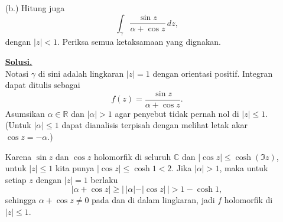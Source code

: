 \documentclass[12pt,twoside]{article}
\newenvironment{solution}
{
	\par\noindent\textbf{\underline{Solusi.}}\\
}
{
	\par
}
\begin{document}
\begin{enumerate}
\begin{enumerate}
\begin{solution}
                  Fungsi $\tan z$ memiliki kutub-kutub sederhana di titik-titik $z_k=\tfrac{\pi}{2}+k\pi$, $k\in\mathbb Z$, dengan residu $1$ di setiap kutub, karena di dekat $z_k$ berlaku
                  \[
                    \cos z\approx\cos'(z_k)(z-z_k)=-\sin(z_k)(z-z_k)=\mp (z-z_k),\quad \sin z_k=\pm1,
                  \]
                  sehingga $\tan z\sim\pm1/\bigl(\mp(z-z_k)\bigr)=1/(z-z_k)$.

                  Di dalam persegi panjang $R$ kita punya syarat $-\pi\le\Im z\le\pi$ dan $0\le\Re z\le2\pi N$. Maka $\Im z_k=0$ selalu memenuhi, sedangkan $\Re z_k=\frac\pi2+k\pi$ harus berada antara $0$ dan $2\pi N$. Hal ini setara dengan
                  \[
                    0\le\tfrac\pi2+k\pi\le2\pi N\iff -\tfrac12\le k\le2N-\tfrac12.
                  \]
                  Karena $k$ bilangan bulat, $k$ mengambil nilai $0,1,\dots,2N-1$, jadi ada tepat $2N$ kutub sederhana di dalam $R$.

                  Dengan Teorema Residuo,
                  \[
                    \int_\gamma \tan z\,dz=2\pi i\sum\operatorname{Res}(\tan z;z_k)=2\pi i\cdot(2N)\cdot1=4\pi iN.
                  \]
                  Jadi
                  \[
                    \int_\gamma\dfrac{\sin z}{\cos z}\,dz=4\pi iN.
                  \]
                \end{solution}

          \item[(b.)] Hitung juga
                $$\int_{\gamma}\dfrac{\sin z}{\alpha+\cos z}\,dz,$$
                dengan $|z|<1$. Periksa semua ketaksamaan yang dignakan.
                \begin{solution}
                  Notasi $\gamma$ di sini adalah lingkaran $|z|=1$ dengan orientasi positif. Integran dapat ditulis sebagai
                  \[
                    f(z)=\frac{\sin z}{\alpha+\cos z}.
                  \]
                  Asumsikan $\alpha\in\mathbb R$ dan $|\alpha|>1$ agar penyebut tidak pernah nol di $|z|\le1$. (Untuk $|\alpha|\le1$ dapat dianalisis terpisah dengan melihat letak akar $\cos z=-\alpha$.)

                  Karena $\sin z$ dan $\cos z$ holomorfik di seluruh $\mathbb C$ dan $|\cos z|\le\cosh(\Im z)$, untuk $|z|\le1$ kita punya $|\cos z|\le\cosh1<2$. Jika $|\alpha|>1$, maka untuk setiap $z$ dengan $|z|=1$ berlaku
                  \[
                    |\alpha+\cos z|\ge|\,|\alpha|-|\cos z|\,|>1-\cosh1,
                  \]
                  sehingga $\alpha+\cos z\ne0$ pada dan di dalam lingkaran, jadi $f$ holomorfik di $|z|\le1$.


\end{solution}
\end{enumerate}
\end{enumerate}
\end{document}
